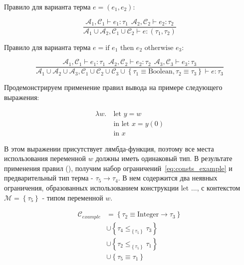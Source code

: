 Правило для варианта терма $e = (e_1, e_2)$:

\begin{equation}
    \label{eq:tuple_infer}
    \frac{
        \mathcal{A}_1, \mathcal{C}_1 \vdash e_1: \tau_1 ~~ \mathcal{A}_2, \mathcal{C}_2 \vdash e_2: \tau_2
    }{
        \mathcal{A}_1 \cup \mathcal{A}_2, \mathcal{C}_1 \cup \mathcal{C}_2 \vdash e: (\tau_1, \tau_2)
    }
\end{equation}

Правило для варианта терма $e = \text{if } e_1 \text{ then } e_2 \text{ otherwise } e_3$:

\begin{equation}
    \label{eq:if_infer}
    \frac{
        \mathcal{A}_1, \mathcal{C}_1 \vdash e_1: \tau_1 ~~ \mathcal{A}_2, \mathcal{C}_2 \vdash e_2: \tau_2 ~~ \mathcal{A}_3, \mathcal{C}_3 \vdash e_3: \tau_3
    }{
        \mathcal{A}_1 \cup \mathcal{A}_2 \cup \mathcal{A}_3, \mathcal{C}_1 \cup \mathcal{C}_2 \cup \mathcal{C}_3 \cup \left\{ \tau_1 \equiv \text{Boolean}, \tau_2 \equiv \tau_3 \right\} \vdash e: \tau_3
    }
\end{equation}

Продемонстрируем применение правил вывода на примере следующего выражения:

\begin{equation}
    \label{eq:expr_example}
    \begin{aligned}
        \lambda w. ~&\text{let } y = w \\
        &\text{in let } x = y(0) \\
        &\text{in } x
    \end{aligned}
\end{equation}

В этом выражении присутствует лямбда-функция, поэтому все места использования переменной $w$ должны иметь одинаковый тип.
В результате применения правил (), получим набор ограничений~\ref{eq:consts_example} и предварительный тип терма - $\tau_5 \to \tau_4$.
В нем содержится два неявных ограничения, образованных использованием конструкции $\text{let } \ldots$, с контекстом $\mathcal{M} = \left\{ \tau_5 \right\}$ - типом переменной $w$.

\begin{equation}
    \label{eq:consts_example}
    \begin{aligned}
        \mathcal{C}_{example} &= \left\{ \tau_2 \equiv \text{Integer} \to \tau_3 \right\} \\
        &\cup \left\{ \tau_4 \leq_{\left\{ \tau_5 \right\}} \tau_3 \right\} \\
        &\cup \left\{ \tau_2 \leq_{\left\{ \tau_5 \right\}} \tau_1 \right\} \\
        &\cup \left\{ \tau_5 \equiv \tau_1 \right\}
    \end{aligned}
\end{equation}

